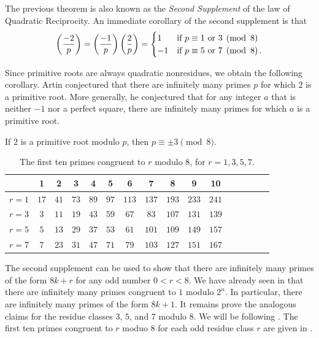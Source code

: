 The previous theorem is also known as the \emph{Second Supplement} of the law of Quadratic Reciprocity. An immediate corollary of the second supplement is that
\begin{equation*}
  \legendre{-2}{p}=\legendre{-1}{p}\legendre{2}{p}=
  \begin{cases}
    1 & \text{if }p\equiv 1\text{ or }3 \pmod{8} \\
    -1 & \text{if }p\equiv 5\text{ or }7\pmod{8}.
  \end{cases}
\end{equation*}

Since primitive roots are always quadratic nonresidues, we obtain the following corollary. Artin conjectured that there are infinitely many primes $p$ for which $2$ is a primitive root. More generally, he conjectured that for any integer $a$ that is neither $-1$ nor a perfect square, there are infinitely many primes for which $a$ is a primitive root.

\begin{corollary}
  If $2$ is a primitive root modulo $p$, then $p\equiv\pm 3\pmod{8}$.
\end{corollary}

\begin{table}[t]
  \centering
  \begin{tabular}{r|ccccccccccccccc}
          & 1\supst{}  & 2\supnd{}  & 3\suprd{}  & 4\supth{}  & 5\supth{}  & 6\supth{}   & 7\supth{}   & 8\supth{}   & 9\supth{}   & 10\supth{}  \\ \midrule
    $r=1$ & $17$ & $41$ & $73$ & $89$ & $97$ & $113$ & $137$ & $193$ & $233$ & $241$ \\
    $r=3$ & $3$  & $11$ & $19$ & $43$ & $59$ & $67$  & $83$  & $107$ & $131$ & $139$ \\
    $r=5$ & $5$  & $13$ & $29$ & $37$ & $53$ & $61$  & $101$ & $109$ & $149$ & $157$ \\
    $r=7$ & $7$  & $23$ & $31$ & $47$ & $71$ & $79$  & $103$ & $127$ & $151$ & $167$ \\
  \end{tabular}
  \caption[The first ten primes in each residue class modulo $8$]{\label{table:primes-congruent-to-r-mod-8}The first ten primes congruent to $r$ modulo $8$, for $r=1,3,5,7$.}
\end{table}

The second supplement can be used to show that there are infinitely many primes of the form $8k+r$ for any odd number $0<r<8$. We have already seen in  that there are infinitely many primes congruent to $1$ modulo $2^n$. In particular, there are infinitely many primes of the form $8k+1$. It remains prove the analogous claims for the residue classes $3$, $5$, and $7$ modulo $8$. We will be following \Sierpinski{} \cite{sierpinski1988}. The first ten primes congruent to $r$ moduo $8$ for each odd residue class $r$ are given in .

